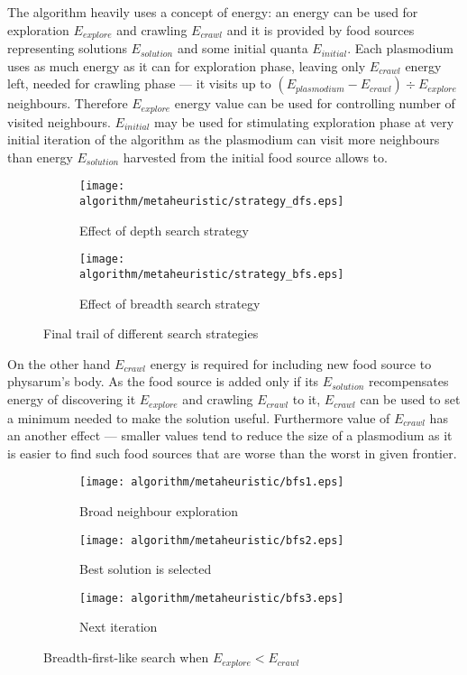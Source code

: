 The algorithm heavily uses a concept of energy: an energy can be used for exploration $E_{explore}$ and crawling $E_{crawl}$ and it is provided by food sources representing solutions $E_{solution}$ and some initial quanta $E_{initial}$. Each plasmodium uses as much energy as it can for exploration phase, leaving only $E_{crawl}$ energy left, needed for crawling phase --- it visits up to $(E_{plasmodium} - E_{crawl}) \div E_{explore}$ neighbours. Therefore $E_{explore}$ energy value can be used for controlling number of visited neighbours. $E_{initial}$ may be used for stimulating exploration phase at very initial iteration of the algorithm as the plasmodium can visit more neighbours than energy $E_{solution}$ harvested from the initial food source allows to.

\begin{figure}
  \centering

  \begin{subfigure}{0.47\textwidth}
    \centering
    \texttt{[image: algorithm/metaheuristic/strategy\_dfs.eps]}
    \caption{Effect of depth search strategy}
  \end{subfigure}
  \begin{subfigure}{0.47\textwidth}
    \centering
    \texttt{[image: algorithm/metaheuristic/strategy\_bfs.eps]}
    \caption{Effect of breadth search strategy}
  \end{subfigure}

  \caption{Final trail of different search strategies}
  \label{figure:m_strategy}
\end{figure}

On the other hand $E_{crawl}$ energy is required for including new food source to physarum's body. As the food source is added only if its $E_{solution}$ recompensates energy of discovering it $E_{explore}$ and crawling $E_{crawl}$ to it, $E_{crawl}$ can be used to set a minimum needed to make the solution useful. Furthermore value of $E_{crawl}$ has an another effect --- smaller values tend to reduce the size of a plasmodium as it is easier to find such food sources that are worse than the worst in given frontier.

\begin{figure}
  \centering

  \begin{subfigure}{0.3\textwidth}
    \centering
    \texttt{[image: algorithm/metaheuristic/bfs1.eps]}
    \caption{Broad neighbour exploration}
  \end{subfigure}
  \begin{subfigure}{0.3\textwidth}
    \centering
    \texttt{[image: algorithm/metaheuristic/bfs2.eps]}
    \caption{Best solution is selected}
  \end{subfigure}
  \begin{subfigure}{0.3\textwidth}
    \centering
    \texttt{[image: algorithm/metaheuristic/bfs3.eps]}
    \caption{Next iteration}
  \end{subfigure}

  \caption{Breadth-first-like search when $E_{explore} < E_{crawl}$}
  \label{figure:m_explore_bfs}
\end{figure}

